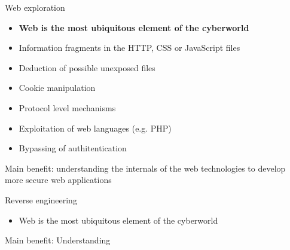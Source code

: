 \documentclass[12 pt]{beamer}
\begin{document}

\begin{frame}{Web exploration}

  \begin{itemize}
    \item{\textbf{Web is the most ubiquitous element of the cyberworld}}
    \item{Information fragments in the HTTP, CSS or JavaScript files}
    \item{Deduction of possible unexposed files}
    \item{Cookie manipulation}
    \item{Protocol level mechanisms}
    \item{Exploitation of web languages (e.g. PHP)}
    \item{Bypassing of authitentication}
  \end{itemize}

  \begin{exampleblock}{}
    Main benefit: understanding the internals of the web technologies to develop more secure web applications
  \end{exampleblock}
\end{frame}


\begin{frame}{Reverse engineering}

  \begin{itemize}
    \item{Web is the most ubiquitous element of the cyberworld}
  \end{itemize}

  \begin{exampleblock}{}
    Main benefit: Understanding 
  \end{exampleblock}

\end{frame}

\end{document}
